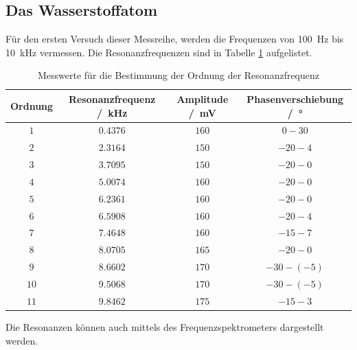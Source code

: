 \subsection{Das Wasserstoffatom}
Für den ersten Versuch dieser Messreihe, werden die Frequenzen von \SI{100}{\hertz} bis \SI{10}{\kilo\hertz} vermessen.
Die Resonanzfrequenzen sind in Tabelle \ref{tab:Resonanzfrequenzen} aufgelistet.
\FloatBarrier
\begin{table}
    \centering
    \caption{Messwerte für die Bestimmung der Ordnung der Resonanzfrequenz}
    \label{tab:Resonanzfrequenzen}
    \begin{tabular}{c c c c}
        \toprule
        Ordnung&Resonanzfrequenz /\SI{}{\kilo\hertz} &Amplitude /\SI{}{\milli\volt}& Phasenverschiebung /\SI{}{\degree}\\
        \midrule
        $\num{1}$&$\num{0.4376}$&$\num{160}$&$\num{0}-  \num{30}$\\
        $\num{2}$&$\num{2.3164}$&$\num{150}$&$\num{-20}-\num{4}$\\
        $\num{3}$&$\num{3.7095}$&$\num{150}$&$\num{-20}-\num{0}$\\
        $\num{4}$&$\num{5.0074}$&$\num{160}$&$\num{-20}-\num{0}$\\
        $\num{5}$&$\num{6.2361}$&$\num{160}$&$\num{-20}-\num{0}$\\
        $\num{6}$&$\num{6.5908}$&$\num{160}$&$\num{-20}-\num{4}$\\
        $\num{7}$&$\num{7.4648}$&$\num{160}$&$\num{-15}-\num{7}$\\
        $\num{8}$&$\num{8.0705}$&$\num{165}$&$\num{-20}-\num{0}$\\
        $\num{9}$&$\num{8.6602}$&$\num{170}$&$\num{-30}-(\num{-5})$\\
        $\num{10}$&$\num{9.5068}$&$\num{170}$&$\num{-30}-(\num{-5})$\\
        $\num{11}$&$\num{9.8462}$&$\num{175}$&$\num{-15}-\num{3}$\\
        \bottomrule
    \end{tabular}
\end{table}
\FloatBarrier
Die Resonanzen können auch mittels des Frequenzspektrometers dargestellt werden.
\FloatBarrier
